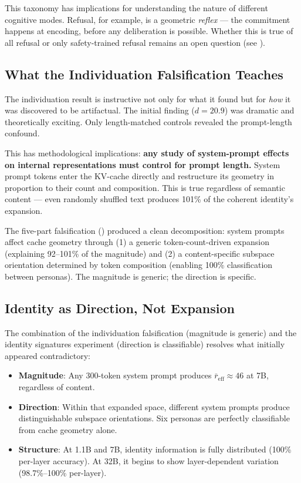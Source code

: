 \documentclass[11pt,a4paper]{article}
\begin{document}
This taxonomy has implications for understanding the nature of different cognitive modes. Refusal, for example, is a geometric \emph{reflex} --- the commitment happens at encoding, before any deliberation is possible. Whether this is true of all refusal or only safety-trained refusal remains an open question (see ).

\subsection{What the Individuation Falsification Teaches}

The individuation result is instructive not only for what it found but for \emph{how} it was discovered to be artifactual. The initial finding ($d = 20.9$) was dramatic and theoretically exciting. Only length-matched controls revealed the prompt-length confound.

This has methodological implications: \textbf{any study of system-prompt effects on internal representations must control for prompt length.} System prompt tokens enter the KV-cache directly and restructure its geometry in proportion to their count and composition. This is true regardless of semantic content --- even randomly shuffled text produces 101\% of the coherent identity's expansion.

The five-part falsification () produced a clean decomposition: system prompts affect cache geometry through (1) a generic token-count-driven expansion (explaining 92--101\% of the magnitude) and (2) a content-specific subspace orientation determined by token composition (enabling 100\% classification between personas). The magnitude is generic; the direction is specific.

\subsection{Identity as Direction, Not Expansion}

The combination of the individuation falsification (magnitude is generic) and the identity signatures experiment (direction is classifiable) resolves what initially appeared contradictory:

\begin{itemize}[leftmargin=*]
    \item \textbf{Magnitude}: Any 300-token system prompt produces $\bar{r}_{\text{eff}} \approx 46$ at 7B, regardless of content.
    \item \textbf{Direction}: Within that expanded space, different system prompts produce distinguishable subspace orientations. Six personas are perfectly classifiable from cache geometry alone.
    \item \textbf{Structure}: At 1.1B and 7B, identity information is fully distributed (100\% per-layer accuracy). At 32B, it begins to show layer-dependent variation (98.7\%--100\% per-layer).
\end{itemize}
\end{document}
